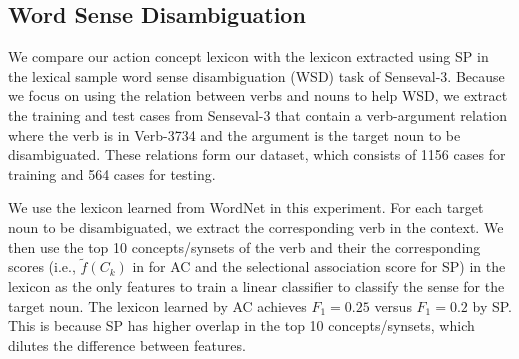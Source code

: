 \subsection{Word Sense Disambiguation}
\label{sec:wsd}
We compare our action concept lexicon with the lexicon extracted
using SP in the lexical sample
word sense disambiguation (WSD) task of
Senseval-3\cite{senseval3}.
Because we focus on using the relation between verbs and
nouns to help WSD,
we extract the training and test cases from Senseval-3
that contain a verb-argument relation
where the verb is in Verb-3734 and the argument is the target noun to be
disambiguated. These relations form our dataset, which consists of
1156 cases for training and 564 cases for testing.

We use the lexicon learned from WordNet in this experiment.
For each target noun to be disambiguated, we extract
the corresponding verb in the context. We then use the
top 10 concepts/synsets of the verb and their
the corresponding scores (i.e., $\tilde{f}(C_k)$ in
 for AC and the selectional
association score for SP) in the lexicon as the only features
to train a linear classifier to classify the sense
for the target noun. The lexicon learned by AC achieves
$F_1 = 0.25$ versus $F_1 = 0.2$ by SP.
This is because SP has higher
overlap in the top 10 concepts/synsets, which dilutes
the difference between features.
